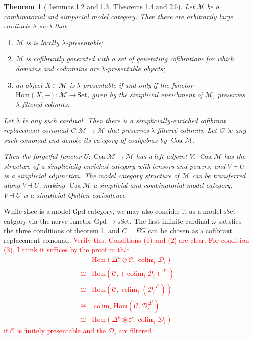 \documentclass{article}
\newcommand{\todo}[1]{\textcolor{red}{#1}}
\newtheorem{theorem}{Theorem}
\theoremstyle{remark}
\theoremstyle{definition}
\begin{document}
\begin{theorem}[\cite{coalgebraic-models} Lemmas 1.2 and 1.3, Theorems 1.4 and 2.5]
  \label{th:coalgebraic-model-category}
  Let $\mathcal{M}$ be a combinatorial and simplicial model category.
  Then there are arbitrarily large cardinals $\lambda$ such that
  \begin{enumerate}
    \item
      $\mathcal{M}$ is is locally $\lambda$-presentable;
    \item
      $\mathcal{M}$ is cofibrantly generated with a set of generating cofibrations for which domains and codomains are $\lambda$-presentable objects;
    \item
      an object $X \in \mathcal{M}$ is $\lambda$-presentable if and only if the functor $\mathrm{Hom}(X, -) : \mathcal{M} \rightarrow \mathrm{Set}$, given by the simplicial enrichment of $\mathcal{M}$, preserves $\lambda$-filtered colimits.
  \end{enumerate}

  Let $\lambda$ be any such cardinal.
  Then there is a simplicially-enriched cofibrant replacement comonad $C : \mathcal{M} \rightarrow \mathcal{M}$ that preserves $\lambda$-filtered colimits. 
  Let $C$ be any such comonad and denote its category of coalgebras by $\operatorname{Coa} \mathcal{M}$.

  Then the forgetful functor $U : \operatorname{Coa} \mathcal{M} \rightarrow \mathcal{M}$ has a left adjoint $V$.
  $\operatorname{Coa} \mathcal{M}$ has the structure of a simplicially enriched category with tensors and powers, and $V \dashv U$ is a simplicial adjunction.
  The model category structure of $\mathcal{M}$ can be transferred along $V \dashv U$, making $\operatorname{Coa} \mathcal{M}$ a simplicial and combinatorial model category.
  $V \dashv U$ is a simplicial Quillen equivalence.
\end{theorem}

While $\mathrm{sLcc}$ is a model $\mathrm{Gpd}$-category, we may also consider it as a model $\mathrm{sSet}$-catgory via the nerve functor $\mathrm{Gpd} \rightarrow \mathrm{sSet}$.
The first infinite cardinal $\omega$ satisfies the three conditions of theorem \ref{th:coalgebraic-model-category}, and $C = FG$ can be chosen as a cofibrant replacement comonad.
\todo{
  Verify this.
  Conditions (1) and (2) are clear.
  For condition (3), I think it suffices by the proof in \cite{coalgebraic-models} that
  \begin{align}
    & \mathrm{Hom}(\Delta^n \otimes \mathcal{C}, \operatorname{colim}_i \mathcal{D}_i) \\
    \cong {} & \mathrm{Hom}(\mathcal{C}, (\operatorname{colim}_i \mathcal{D}_i)^{\Delta^n}) \\
    \cong {} & \mathrm{Hom}(\mathcal{C}, \operatorname{colim}_i (\mathcal{D}_i^{\Delta^n})) \\
    \cong {} & \operatorname{colim}_i \mathrm{Hom}(\mathcal{C}, \mathcal{D}_i^{\Delta^n}) \\
    \cong {} & \mathrm{Hom}(\Delta^n \otimes \mathcal{C}, \operatorname{colim}_i \mathcal{D}_i) 
  \end{align}
  if $\mathcal{C}$ is finitely presentable and the $\mathcal{D}_i$ are filtered.
}
\end{document}
